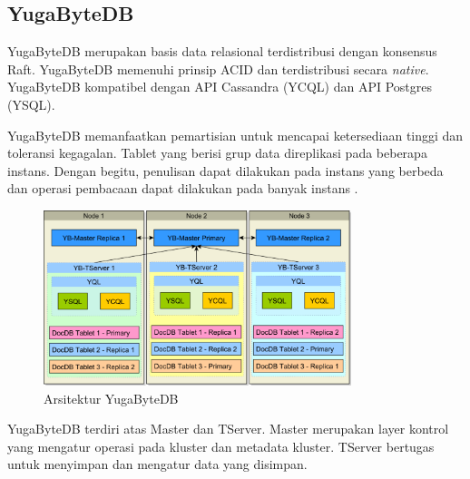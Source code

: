 \subsection{YugaByteDB}

YugaByteDB merupakan basis data relasional terdistribusi dengan konsensus Raft. YugaByteDB memenuhi prinsip ACID dan terdistribusi secara \textit{native}. YugaByteDB kompatibel dengan API Cassandra (YCQL) dan API Postgres (YSQL).

YugaByteDB memanfaatkan pemartisian untuk mencapai ketersediaan tinggi dan toleransi kegagalan. Tablet yang berisi grup data direplikasi pada beberapa instans. Dengan begitu, penulisan dapat dilakukan pada instans yang berbeda dan operasi pembacaan dapat dilakukan pada banyak instans \parencite{yugabyteBaeldung}.

\begin{figure}[htbp]
    \centering
    \includegraphics[width=0.8\textwidth]{resources/chapter-2/yugabyte.png}
    \caption{Arsitektur YugaByteDB \parencite{yugabyteBaeldung}}
    \label{fig:yugabyte-architecture}
\end{figure}

YugaByteDB terdiri atas Master dan TServer. Master merupakan layer kontrol yang mengatur operasi pada kluster dan metadata kluster. TServer bertugas untuk menyimpan dan mengatur data yang disimpan.
